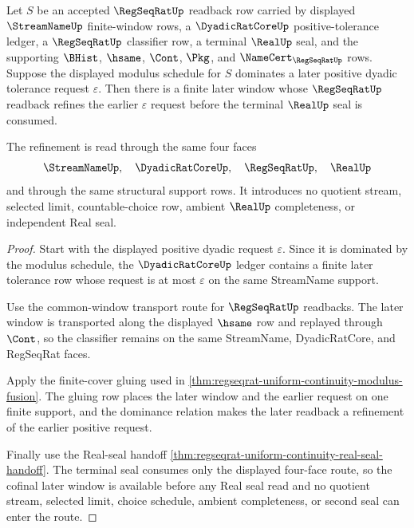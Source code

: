 \begin{theorem}
\label{thm:regseqrat-tail-modulus-positive-cofinal}
Let $S$ be an accepted $\RegSeqRatUp$ readback row carried by displayed
$\StreamNameUp$ finite-window rows, a $\DyadicRatCoreUp$ positive-tolerance
ledger, a $\RegSeqRatUp$ classifier row, a terminal $\RealUp$ seal, and the
supporting $\BHist$, $\hsame$, $\Cont$, $\Pkg$, and
$\NameCert_{\RegSeqRatUp}$ rows. Suppose the displayed modulus schedule for
$S$ dominates a later positive dyadic tolerance request $\varepsilon$. Then
there is a finite later window whose $\RegSeqRatUp$ readback refines the
earlier $\varepsilon$ request before the terminal $\RealUp$ seal is consumed.

The refinement is read through the same four faces
$$
\StreamNameUp,\quad \DyadicRatCoreUp,\quad \RegSeqRatUp,\quad \RealUp
$$
and through the same structural support rows. It introduces no quotient
stream, selected limit, countable-choice row, ambient $\RealUp$ completeness,
or independent Real seal.
\end{theorem}
\begin{proof}
Start with the displayed positive dyadic request $\varepsilon$. Since it is
dominated by the modulus schedule, the $\DyadicRatCoreUp$ ledger contains a
finite later tolerance row whose request is at most $\varepsilon$ on the same
StreamName support.

Use the common-window transport route for $\RegSeqRatUp$ readbacks. The later
window is transported along the displayed $\hsame$ row and replayed through
$\Cont$, so the classifier remains on the same StreamName, DyadicRatCore, and
RegSeqRat faces.

Apply the finite-cover gluing used in
\autoref{thm:regseqrat-uniform-continuity-modulus-fusion}. The gluing row
places the later window and the earlier request on one finite support, and the
dominance relation makes the later readback a refinement of the earlier
positive request.

Finally use the Real-seal handoff
\autoref{thm:regseqrat-uniform-continuity-real-seal-handoff}. The terminal
seal consumes only the displayed four-face route, so the cofinal later window
is available before any Real seal read and no quotient stream, selected limit,
choice schedule, ambient completeness, or second seal can enter the route.
\end{proof}

